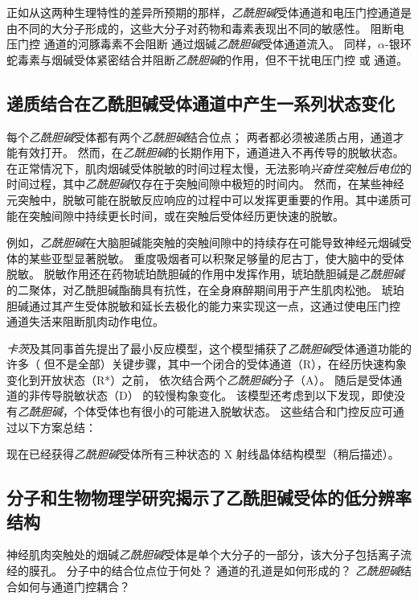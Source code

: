 正如从这两种生理特性的差异所预期的那样，\textit{乙酰胆碱}受体通道和电压门控通道是由不同的大分子形成的，这些大分子对药物和毒素表现出不同的敏感性。
阻断电压门控  通道的河豚毒素不会阻断  通过烟碱\textit{乙酰胆碱}受体通道流入。
同样，$\alpha$-银环蛇毒素与烟碱受体紧密结合并阻断\textit{乙酰胆碱}的作用，但不干扰电压门控  或  通道。



\subsection{递质结合在乙酰胆碱受体通道中产生一系列状态变化}

每个\textit{乙酰胆碱}受体都有两个\textit{乙酰胆碱}结合位点；
两者都必须被递质占用，通道才能有效打开。
然而，在\textit{乙酰胆碱}的长期作用下，通道进入不再传导的脱敏状态。
在正常情况下，肌肉烟碱受体脱敏的时间过程太慢，无法影响\textit{兴奋性突触后电位}的时间过程，其中\textit{乙酰胆碱}仅存在于突触间隙中极短的时间内。
然而，在某些神经元突触中，脱敏可能在脱敏反应响应的过程中可以发挥更重要的作用。其中递质可能在突触间隙中持续更长时间，或在突触后受体经历更快速的脱敏。


例如，\textit{乙酰胆碱}在大脑胆碱能突触的突触间隙中的持续存在可能导致神经元烟碱受体的某些亚型显著脱敏。
重度吸烟者可以积聚足够量的尼古丁，使大脑中的受体脱敏。
脱敏作用还在药物琥珀酰胆碱的作用中发挥作用，琥珀酰胆碱是\textit{乙酰胆碱}的二聚体，对乙酰胆碱酯酶具有抗性，在全身麻醉期间用于产生肌肉松弛。
琥珀胆碱通过其产生受体脱敏和延长去极化的能力来实现这一点，这通过使电压门控  通道失活来阻断肌肉动作电位。


\textit{卡茨}及其同事首先提出了最小反应模型，这个模型捕获了\textit{乙酰胆碱}受体通道功能的许多（ 但不是全部）关键步骤，其中一个闭合的受体通道（R），在经历快速构象变化到开放状态（R*）之前， 依次结合两个\textit{乙酰胆碱}分子（A）。
随后是受体通道的非传导脱敏状态（D） 的较慢构象变化。
该模型还考虑到以下发现，即使没有\textit{乙酰胆碱}，个体受体也有很小的可能进入脱敏状态。
这些结合和门控反应可通过以下方案总结：


现在已经获得\textit{乙酰胆碱}受体所有三种状态的 X 射线晶体结构模型（稍后描述）。



\subsection{分子和生物物理学研究揭示了乙酰胆碱受体的低分辨率结构}

神经肌肉突触处的烟碱\textit{乙酰胆碱}受体是单个大分子的一部分，该大分子包括离子流经的膜孔。
分子中的结合位点位于何处？ 通道的孔道是如何形成的？
\textit{乙酰胆碱}结合如何与通道门控耦合？



